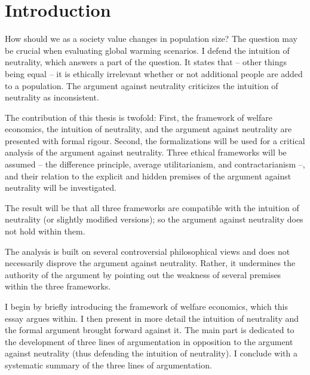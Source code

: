 \chapter*{Introduction}

How should we as a society value changes in population size? The question may be crucial when evaluating global warming scenarios. I defend the intuition of neutrality, which answers a part of the question. It states that – other things being equal – it is ethically irrelevant whether or not additional people are added to a population. The argument against neutrality criticizes the intuition of neutrality as inconsistent. 

The contribution of this thesis is twofold: First, the framework of welfare economics, the intuition of neutrality, and the argument against neutrality are presented with formal rigour. Second, the formalizations will be used for a critical analysis of the argument against neutrality. Three ethical frameworks will be assumed -- the difference principle, average utilitarianism, and contractarianism --, and their relation to the explicit and hidden premises of the argument against neutrality will be investigated. 

The result will be that all three frameworks are compatible with the intuition of neutrality (or slightly modified versions); so the argument against neutrality does not hold within them. 

The analysis is built on several controversial philosophical views and does not necessarily disprove the argument against neutrality. Rather, it undermines the authority of the argument by pointing out the weakness of several premises within the three frameworks.  

I begin by briefly introducing the framework of welfare economics, which this essay argues within. I then present in more detail the intuition of neutrality and the formal argument brought forward against it. The main part is dedicated to the development of three lines of argumentation in opposition to the argument against neutrality (thus defending the intuition of neutrality). I conclude with a systematic summary of the three lines of argumentation. 